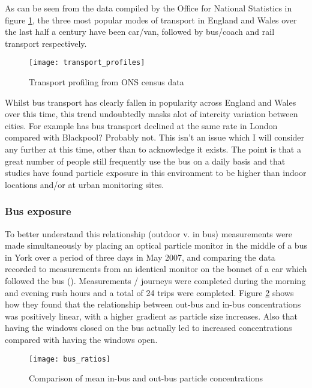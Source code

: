 As can be seen from the data compiled by the Office for National Statistics in figure \ref{fig:transportprofiles}, the three most popular modes of transport in England and Wales over the last half a century have been car/van, followed by bus/coach and rail transport respectively. 

\begin{figure}[H]
\centering
\texttt{[image: transport\_profiles]}
\caption{Transport profiling from ONS census data}
\label{fig:transportprofiles}
\end{figure}

Whilst bus transport has clearly fallen in popularity across England and Wales over this time, this trend undoubtedly masks alot of intercity variation between cities. For example has bus transport declined at the same rate in London compared with Blackpool? Probably not. This isn’t an issue which I will consider any further at this time, other than to acknowledge it exists. The point is that a great number of people still frequently use the bus on a daily basis and that studies have found particle exposure in this environment to be higher than indoor locations and/or at urban monitoring sites.\medskip

\subsubsection{Bus exposure}
\label{subsubsec:busexposure}

To better understand this relationship (outdoor v. in bus) measurements were made simultaneously by placing an optical particle monitor in the middle of a bus in York over a period of three days in May 2007, and comparing the data recorded to measurements from an identical monitor on the bonnet of a car which followed the bus (\cite{Song2009}). Measurements / journeys were completed during the morning and evening rush hours and a total of 24 trips were completed. Figure \ref{fig:bus_ratios} shows how they found that the relationship between out-bus and in-bus concentrations was positively linear, with a higher gradient as particle size increases. Also that having the windows closed on the bus actually led to increased concentrations compared with having the windows open.

\begin{figure}[H]
\centering
\texttt{[image: bus\_ratios]}
\caption{Comparison of mean in-bus and out-bus particle concentrations}
\label{fig:bus_ratios}
\end{figure}


